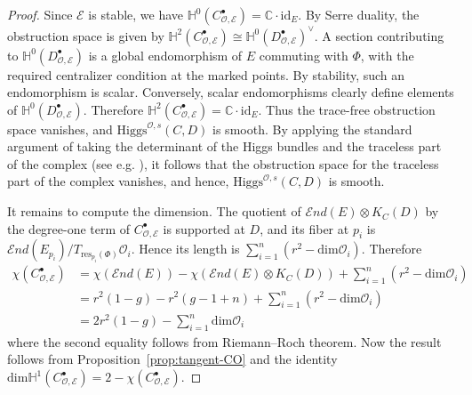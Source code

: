 \documentclass[11pt]{amsart}
\theoremstyle{plain}
\theoremstyle{definition}
\theoremstyle{remark}
\newcommand{\C}{\mathbb C}
\newcommand{\End}{\mathcal E nd}
\newcommand{\id}{\mathrm{id}}
\newcommand{\HH}{\mathbb H}
\newcommand{\cO}{\mathcal O}
\newcommand{\Higgs}{\mathrm{Higgs}}
\def\C{\mathbb{C}}
\def\dim{\mathrm{dim}}
\def\res{\mathrm{res}}
\begin{document}
\begin{proof}
Since $\mathcal E$ is stable, we have $\HH^0(C_{\cO,\mathcal E}^\bullet)=\C\cdot\id_E$. By Serre duality, the obstruction space is given by $
\HH^2(C_{\cO,\mathcal E}^\bullet)
\cong
\HH^0(D_{\cO,\mathcal E}^\bullet)^\vee$. A section
contributing to $\HH^0(D_{\cO,\mathcal E}^\bullet)$ is a global endomorphism of
$E$ commuting with $\Phi$, with the required centralizer condition at the marked
points. By stability, such an endomorphism is scalar. Conversely, scalar
endomorphisms clearly define elements of $\HH^0(D_{\cO,\mathcal E}^\bullet)$.
Therefore $\HH^2(C_{\cO,\mathcal E}^\bullet)=\C \cdot \mathrm{id}_E$. Thus the trace-free obstruction space vanishes, and $\Higgs^{\cO,s}(C,D)$ is
smooth. By applying the standard argument of taking the determinant of the Higgs bundles and the traceless part of the complex (see e.g. \cite[Corollary 2.11]{LeeLee2024}), it follows that the obstruction space for the traceless part of the complex vanishes, and hence, $\Higgs^{\cO,s}(C,D)$ is
smooth.

It remains to compute the dimension. The quotient of
$\End(E)\otimes K_C(D)$ by the degree-one term of
$C_{\cO,\mathcal E}^\bullet$ is supported at $D$, and its fiber at $p_i$ is $
\End(E_{p_i})/T_{\res_{p_i}(\Phi)}\cO_i$. Hence its length is $\sum_{i=1}^n(r^2-\dim\cO_i)$.
Therefore
\[
\begin{aligned}
    \chi(C_{\cO,\mathcal E}^\bullet)&=
\chi(\End(E))
-
\chi(\End(E)\otimes K_C(D))
+
\sum_{i=1}^n(r^2-\dim\cO_i)\\
&=r^2(1-g)-r^2(g-1+n)+\sum_{i=1}^n(r^2-\dim \cO_i) \\
&=2r^2(1-g)-\sum_{i=1}^n\dim \cO_i
\end{aligned}
\]
where the second equality follows from Riemann--Roch theorem. Now the result follows from Proposition~\ref{prop:tangent-CO} and the identity $\dim \HH^1(C^\bullet_{\cO, \mathcal{E}})=2-\chi(C^\bullet_{\cO,\mathcal{E}})$. 
\end{proof}
\end{document}
